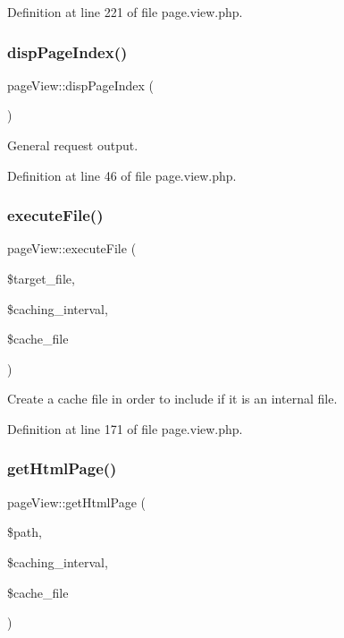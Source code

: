 Definition at line 221 of file page.\+view.\+php.

\hypertarget{classpageView_a9e3cf0b29ff11a4bbb1ec1ccfacd4236}{}\label{classpageView_a9e3cf0b29ff11a4bbb1ec1ccfacd4236} 
\subsubsection{\texorpdfstring{disp\+Page\+Index()}{dispPageIndex()}}
{\footnotesize\ttfamily page\+View\+::disp\+Page\+Index (\begin{DoxyParamCaption}{ }\end{DoxyParamCaption})}



General request output. 



Definition at line 46 of file page.\+view.\+php.

\hypertarget{classpageView_a198777f4c0155f8ad2a0c2826221395e}{}\label{classpageView_a198777f4c0155f8ad2a0c2826221395e} 
\subsubsection{\texorpdfstring{execute\+File()}{executeFile()}}
{\footnotesize\ttfamily page\+View\+::execute\+File (\begin{DoxyParamCaption}\item[{}]{\$target\+\_\+file,  }\item[{}]{\$caching\+\_\+interval,  }\item[{}]{\$cache\+\_\+file }\end{DoxyParamCaption})}



Create a cache file in order to include if it is an internal file. 



Definition at line 171 of file page.\+view.\+php.

\hypertarget{classpageView_af3d32b790b5703c5eb384060b24d619e}{}\label{classpageView_af3d32b790b5703c5eb384060b24d619e} 
\subsubsection{\texorpdfstring{get\+Html\+Page()}{getHtmlPage()}}
{\footnotesize\ttfamily page\+View\+::get\+Html\+Page (\begin{DoxyParamCaption}\item[{}]{\$path,  }\item[{}]{\$caching\+\_\+interval,  }\item[{}]{\$cache\+\_\+file }\end{DoxyParamCaption})}



